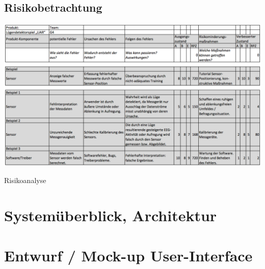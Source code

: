\documentclass[10pt, a4paper, oneside, titlepage]{scrartcl} %
\begin{document}
	\begin{landscape}
   	\section{Risikobetrachtung}
   	\begin{table}[h!]
		\begin{center}
			\includegraphics[scale=0.45]{Risikobetrachtung.png}
		\end{center}
		\caption[Risikoanalyse]{Risikoanalyse}
		\label{fig:risikoanalyse}
	\end{table}
	\end{landscape}
   
   \section{Systemüberblick, Architektur}
   \section{Entwurf / Mock-up User-Interface}

\label{letzte_seite} %
\end{document}

